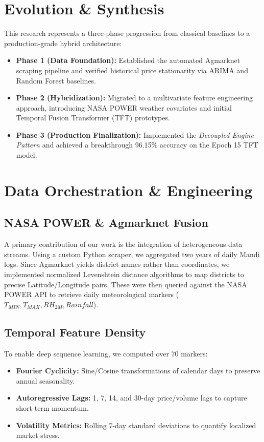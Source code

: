 \documentclass[conference]{IEEEtran}
\begin{document}
\section{Evolution & Synthesis}
This research represents a three-phase progression from classical baselines to a production-grade hybrid architecture:
\begin{itemize}[leftmargin=*]
    \item \textbf{Phase 1 (Data Foundation):} Established the automated Agmarknet scraping pipeline and verified historical price stationarity via ARIMA and Random Forest baselines.
    \item \textbf{Phase 2 (Hybridization):} Migrated to a multivariate feature engineering approach, introducing NASA POWER weather covariates and initial Temporal Fusion Transformer (TFT) prototypes.
    \item \textbf{Phase 3 (Production Finalization):} Implemented the \textit{Decoupled Engine Pattern} and achieved a breakthrough 96.15\% accuracy on the Epoch 15 TFT model.
\end{itemize}

\section{Data Orchestration \& Engineering}

\subsection{NASA POWER \& Agmarknet Fusion}
A primary contribution of our work is the integration of heterogeneous data streams. Using a custom Python scraper, we aggregated two years of daily Mandi logs. Since Agmarknet yields district names rather than coordinates, we implemented normalized Levenshtein distance algorithms to map districts to precise Latitude/Longitude pairs. These were then queried against the NASA POWER API to retrieve daily meteorological markers ($T_{MIN}, T_{MAX}, RH_{2M}, Rainfall$).

\subsection{Temporal Feature Density}
To enable deep sequence learning, we computed over 70 markers:
\begin{itemize}
    \item \textbf{Fourier Cyclicity:} Sine/Cosine transformations of calendar days to preserve annual seasonality.
    \item \textbf{Autoregressive Lags:} 1, 7, 14, and 30-day price/volume lags to capture short-term momentum.
    \item \textbf{Volatility Metrics:} Rolling 7-day standard deviations to quantify localized market stress.
\end{itemize}
\end{document}
